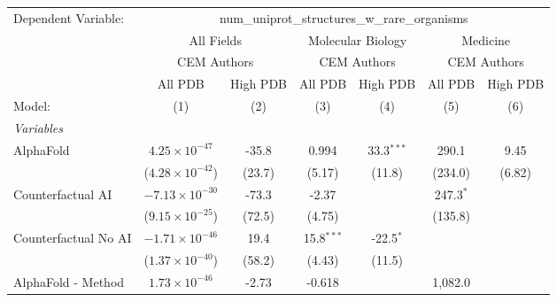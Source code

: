 \begingroup
\centering
\begin{tabular}{lcccccc}
   \tabularnewline \midrule \midrule
   Dependent Variable: & \multicolumn{6}{c}{num\_uniprot\_structures\_w\_rare\_organisms}\\
 & \multicolumn{2}{c}{All Fields} & \multicolumn{2}{c}{Molecular Biology} & \multicolumn{2}{c}{Medicine} \\
\cmidrule(lr){2-3} \cmidrule(lr){4-5} \cmidrule(lr){6-7}
 & \multicolumn{2}{c}{CEM Authors} & \multicolumn{2}{c}{CEM Authors} & \multicolumn{2}{c}{CEM Authors} \\
\cmidrule(lr){2-3} \cmidrule(lr){4-5} \cmidrule(lr){6-7}
 & \multicolumn{1}{c}{All PDB} & \multicolumn{1}{c}{High PDB} & \multicolumn{1}{c}{All PDB} & \multicolumn{1}{c}{High PDB} & \multicolumn{1}{c}{All PDB} & \multicolumn{1}{c}{High PDB} \\
\cmidrule(lr){2-2} \cmidrule(lr){3-3} \cmidrule(lr){4-4} \cmidrule(lr){5-5} \cmidrule(lr){6-6} \cmidrule(lr){7-7}
   Model:                                                  & (1)                      & (2)    & (3)          & (4)          & (5)             & (6)\\  
   \midrule
   \emph{Variables}\\
   AlphaFold                                               & $4.25\times 10^{-47}$    & -35.8  & 0.994        & 33.3$^{***}$ & 290.1           & 9.45\\   
                                                           & ($4.28\times 10^{-42}$)  & (23.7) & (5.17)       & (11.8)       & (234.0)         & (6.82)\\   
   Counterfactual AI                                       & $-7.13\times 10^{-30}$   & -73.3  & -2.37        &              & 247.3$^{*}$     &   \\   
                                                           & ($9.15\times 10^{-25}$)  & (72.5) & (4.75)       &              & (135.8)         &   \\   
   Counterfactual No AI                                    & $-1.71\times 10^{-46}$   & 19.4   & 15.8$^{***}$ & -22.5$^{*}$  &                 &   \\   
                                                           & ($1.37\times 10^{-40}$)  & (58.2) & (4.43)       & (11.5)       &                 &   \\   
   AlphaFold - Method                                      & $1.73\times 10^{-46}$    & -2.73  & -0.618       &              & 1,082.0         &   \\   

\end{tabular}
